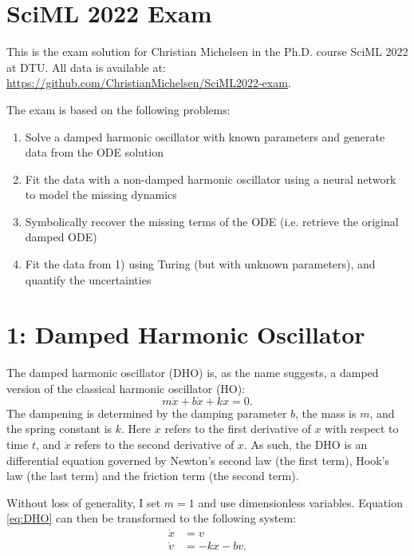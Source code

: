 \documentclass[10pt,a4paper]{article}
\begin{document}
\section*{SciML 2022 Exam}

This is the exam solution for Christian Michelsen in the Ph.D. course SciML 2022 at DTU.
All data is available at: \url{https://github.com/ChristianMichelsen/SciML2022-exam}.

\vspace{1cm}

\noindent The exam is based on the following problems:
\begin{enumerate}
    \item Solve a damped harmonic oscillator with known parameters and generate data from the ODE solution
    \item Fit the data with a non-damped harmonic oscillator using a neural network to model the missing dynamics
    \item Symbolically recover the missing terms of the ODE (i.e. retrieve the original damped ODE)
    \item Fit the data from 1) using Turing (but with unknown parameters), and quantify the uncertainties
\end{enumerate}

\clearpage
\section*{1: Damped Harmonic Oscillator}

The damped harmonic oscillator (DHO) is, as the name suggests, a damped version of the classical harmonic oscillator (HO):
\begin{equation}
    m \ddot{x} + b\dot{x} + kx = 0.
    \label{eq:DHO}
\end{equation}
The dampening is determined by the damping parameter $b$, the mass is $m$, and the spring constant is $k$.
Here $\dot{x}$ refers to the first derivative of $x$ with respect to time $t$, and $\ddot{x}$ refers to the second derivative of $x$.
As such, the DHO is an differential equation governed by Newton's second law (the first term),
Hook's law (the last term) and the friction term (the second term).

Without loss of generality, I set $m=1$ and use dimensionless variables.
Equation \eqref{eq:DHO} can then be transformed to the following system:
\begin{equation}
    \begin{split}
        \dot{x} &= v \\
        \dot{v} &= -kx - bv.
    \end{split}
    \label{eq:DHO_2D}
\end{equation}
\end{document}
